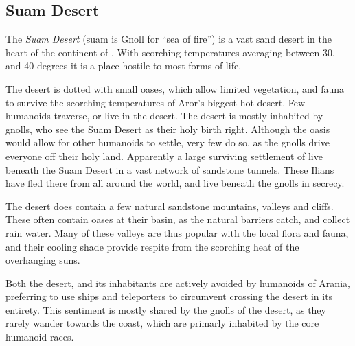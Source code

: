 \subsection{Suam Desert}
\label{sec:Suam Desert}

The \emph{Suam Desert} (suam is Gnoll for ``sea of fire'') is a vast sand
desert in the heart of the continent of . With scorching
temperatures averaging between 30, and 40 degrees it is a place hostile to
most forms of life.

The desert is dotted with small oases, which allow limited vegetation, and
fauna to survive the scorching temperatures of Aror's biggest hot desert.
Few humanoids traverse, or live in the desert. The desert is mostly inhabited
by gnolls, who see the Suam Desert as their holy birth right. Although the
oasis would allow for other humanoids to settle, very few do so, as the gnolls
drive everyone off their holy land. Apparently a large surviving settlement
of  live beneath the Suam Desert in a vast network of
sandstone tunnels. These Ilians have fled there from all around the world,
and live beneath the gnolls in secrecy.

The desert does contain a few natural sandstone mountains, valleys and
cliffs. These often contain oases at their basin, as the natural barriers
catch, and collect rain water. Many of these valleys are thus popular with
the local flora and fauna, and their cooling shade provide respite from
the scorching heat of the overhanging suns.

Both the desert, and its inhabitants are actively avoided by humanoids of
Arania, preferring to use ships and teleporters to circumvent crossing the
desert in its entirety. This sentiment is mostly shared by the gnolls of
the desert, as they rarely wander towards the coast, which are primarly
inhabited by the core humanoid races.
